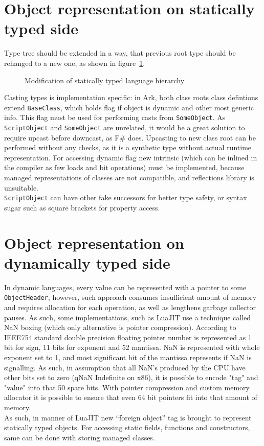 \documentclass[times, %
	specification,annotation, %
	titlepage-extra-ru,specification-extra-ru,annotation-extra-ru, %
	languages={russian,english} %
	]{itmo-student-thesis}
\begin{document}
\section{Object representation on statically typed side}
Type tree should be extended in a way, that previous root type should be rehanged to a new one, as shown in figure~\ref{fig:statically-typed-tree}.
\begin{figure}[!h]
	\caption{Modification of statically typed language hierarchy}\label{fig:statically-typed-tree}
	\centering
	
\end{figure}
Casting types is implementation specific: in Ark, both class roots class defintions extend \texttt{BaseClass}, which holds flag if object is dynamic and other most generic info. This flag must be used for performing casts from \texttt{SomeObject}. As \texttt{ScriptObject} and \texttt{SomeObject} are unrelated, it would be a great solution to require upcast before downcast, as F\# does. Upcasting to new class root can be performed without any checks, as it is a synthetic type without actual runtime representation. For accessing dynamic flag new intrinsic (which can be inlined in the compiler as few loads and bit operations) must be implemented, because managed representations of classes are not compatible, and reflections library is unsuitable.\\
\texttt{ScriptObject} can have other fake successors for better type safety, or syntax sugar such as square brackets for property access.\\

\section{Object representation on dynamically typed side}
In dynamic languages, every value can be represented with a pointer to some \texttt{ObjectHeader}, however, such approach consumes insufficient amount of memory and requires allocation for each operation, as well as lengthens garbage collector pauses. As such, some implementations, such as LuaJIT use a technique called NaN boxing (which only alternative is pointer compression). According to IEEE754 standard double precision floating pointer number is represented as 1 bit for sign, 11 bits for exponent and 52 mantissa. NaN is represented with whole exponent set to 1, and most significant bit of the mantissa represents if NaN is signalling. As such, in assumption that all NaN's produced by the CPU have other bits set to zero (qNaN Indefinite on x86), it is possible to encode "tag" and "value" into that 50 spare bits. With pointer compression and custom memory allocator it is possible to ensure that even 64 bit pointers fit into that amount of memory.\\
As such, in manner of LuaJIT new ``foreign object'' tag is brought to represent statically typed objects. For accessing static fields, functions and constructors, same can be done with storing managed classes.
\end{document}
